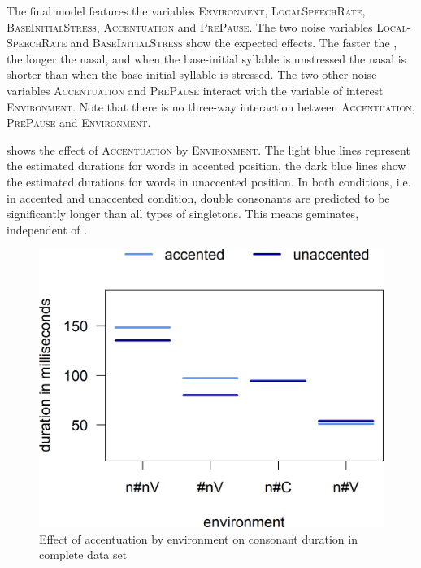 The final model features the variables \textsc{Environment}, \textsc{LocalSpeechRate}, \textsc{BaseInitialStress}, \textsc{Accentuation} and \textsc{PrePause}.
The two noise variables \textsc{Local-SpeechRate} and \textsc{BaseInitialStress} show the expected effects. The faster the , the longer the nasal, and when the base-initial syllable is unstressed the nasal is shorter than when the base-initial syllable is stressed.
The two other noise variables \textsc{Accentuation} and \textsc{PrePause} interact with the variable of interest \textsc{Environment}. Note that there is no three-way interaction between  \textsc{Accentuation}, \textsc{PrePause} and \textsc{Environment}.

 shows the effect of \textsc{Accentuation} by \textsc{Environment}. The light blue lines represent the estimated durations for words  in accented position, the dark blue lines show the estimated durations for words in unaccented position. In both conditions, i.e. in accented and unaccented condition, double consonants are predicted to be significantly longer than all types of singletons. This means  geminates, independent of .

\begin{figure}
\includegraphics [scale=0.5] {images/Experiment/unModelCompleteInterEnvAcc}
\caption{Effect of accentuation by environment on consonant duration in complete data set\label{fig:NumNasal Acc un experiment}}
\end{figure}


